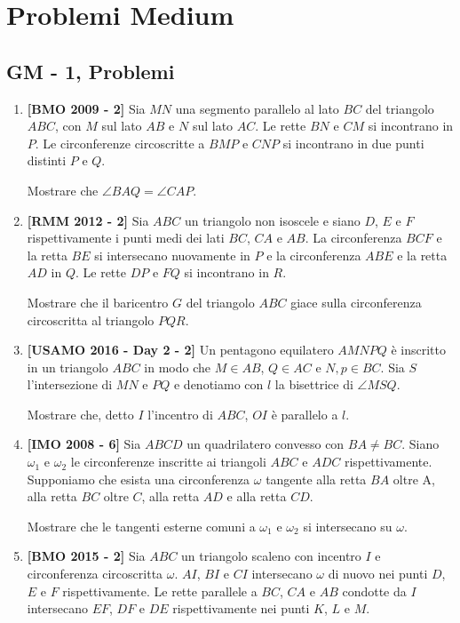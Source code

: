 \clearpage

\section{Problemi Medium}
\subsection{GM - 1, Problemi}
\begin{enumerate}
	\item \textbf{[BMO 2009 - 2]} Sia $MN$ una segmento parallelo al lato $BC$ del triangolo $ABC$, con $M$ sul lato $AB$ e $N$ sul lato $AC$. Le rette $BN$ e $CM$ si incontrano in $P$. Le circonferenze circoscritte a $BMP$ e $CNP$ si incontrano in due punti distinti $P$ e $Q$. 
	
	Mostrare che $\angle BAQ = \angle CAP$.
	\item \textbf{[RMM 2012 - 2]} Sia $ABC$ un triangolo non isoscele e siano $D$, $E$ e $F$ rispettivamente i punti medi dei lati $BC$, $CA$ e $AB$. La circonferenza $BCF$ e la retta $BE$ si intersecano nuovamente in $P$ e la circonferenza $ABE$ e la retta $AD$ in $Q$. Le rette $DP$ e $FQ$ si incontrano in $R$. 
	
	Mostrare che il baricentro $G$ del triangolo $ABC$ giace sulla circonferenza circoscritta al triangolo $PQR$.
	\item \textbf{[USAMO 2016 - Day 2 - 2]} Un pentagono equilatero $AMNPQ$ è inscritto in un triangolo $ABC$ in modo che $M\in AB$, $Q\in AC$ e $N,p \in BC$. Sia $S$ l'intersezione di $MN$ e $PQ$ e denotiamo con $l$ la bisettrice di $\angle MSQ$. 
	
	Mostrare che, detto $I$ l'incentro di $ABC$, $OI$ è parallelo a $l$.
	\item \textbf{[IMO 2008 - 6]} Sia $ABCD$ un quadrilatero convesso con $BA \neq BC$. Siano $\omega_1$ e $\omega_2$ le circonferenze inscritte ai triangoli $ABC$ e $ADC$ rispettivamente. Supponiamo che esista una circonferenza $\omega$ tangente alla retta $BA$ oltre A, alla retta $BC$ oltre $C$, alla retta $AD$ e alla retta $CD$.
	
	Mostrare che le tangenti esterne comuni a $\omega_1$ e $\omega_2$ si intersecano su $\omega$.
	
	\item \textbf{[BMO 2015 - 2]} Sia $ABC$ un triangolo scaleno con incentro $I$ e circonferenza circoscritta $\omega$. $AI$, $BI$ e $CI$ intersecano $\omega$ di nuovo nei punti $D$, $E$ e $F$ rispettivamente. Le rette parallele a $BC$, $CA$ e $AB$ condotte da $I$ intersecano $EF$, $DF$ e $DE$ rispettivamente nei punti $K$, $L$ e $M$.
	

\end{enumerate}
